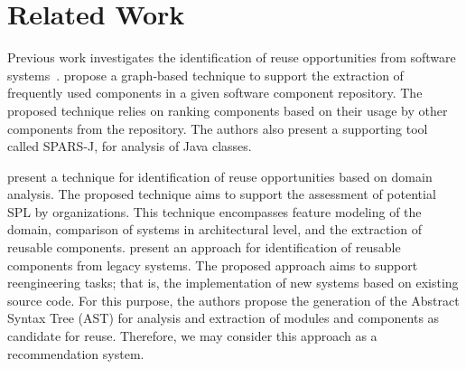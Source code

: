 \section{Related Work}
\label{sec:reuseOpportunities}



Previous work investigates the identification of reuse opportunities from software systems~\citep{inoue2005ranking,koziolek2013experiences,li2005grid,mende2009evaluation,michail1999assessing,oliveira2007automatic,Ye:2005}. \cite{inoue2005ranking} propose a graph-based technique to support the extraction of frequently used components in a given software component repository. The proposed technique relies on ranking components based on their usage by other components from the repository. The authors also present a supporting tool called SPARS-J, for analysis of Java classes. 

\cite{koziolek2013experiences} present a technique for identification of reuse opportunities based on domain analysis. The proposed technique aims to support the assessment of potential SPL by organizations. This technique encompasses feature modeling of the domain, comparison of systems in architectural level, and the extraction of reusable components. \cite{li2005grid} present an approach for identification of reusable components from legacy systems. The proposed approach aims to support reengineering tasks; that is, the implementation of new systems based on existing source code. For this purpose, the authors propose the generation of the Abstract Syntax Tree (AST) for analysis and extraction of modules and components as candidate for reuse. Therefore, we may consider this approach as a recommendation system.

